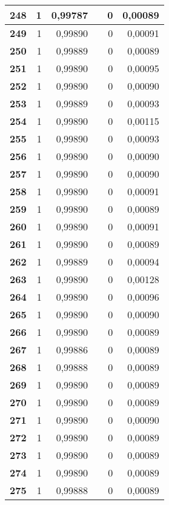 {\begin{longtable}{|r|r|r|l|r|r|}
\textbf{248} & 1 & 0,99787 &  & 0 & 0,00089 \\ \hline
\textbf{249} & 1 & 0,99890 &  & 0 & 0,00091 \\ \hline
\textbf{250} & 1 & 0,99889 &  & 0 & 0,00089 \\ \hline
\textbf{251} & 1 & 0,99890 &  & 0 & 0,00095 \\ \hline
\textbf{252} & 1 & 0,99890 &  & 0 & 0,00090 \\ \hline
\textbf{253} & 1 & 0,99889 &  & 0 & 0,00093 \\ \hline
\textbf{254} & 1 & 0,99890 &  & 0 & 0,00115 \\ \hline
\textbf{255} & 1 & 0,99890 &  & 0 & 0,00093 \\ \hline
\textbf{256} & 1 & 0,99890 &  & 0 & 0,00090 \\ \hline
\textbf{257} & 1 & 0,99890 &  & 0 & 0,00090 \\ \hline
\textbf{258} & 1 & 0,99890 &  & 0 & 0,00091 \\ \hline
\textbf{259} & 1 & 0,99890 &  & 0 & 0,00089 \\ \hline
\textbf{260} & 1 & 0,99890 &  & 0 & 0,00091 \\ \hline
\textbf{261} & 1 & 0,99890 &  & 0 & 0,00089 \\ \hline
\textbf{262} & 1 & 0,99889 &  & 0 & 0,00094 \\ \hline
\textbf{263} & 1 & 0,99890 &  & 0 & 0,00128 \\ \hline
\textbf{264} & 1 & 0,99890 &  & 0 & 0,00096 \\ \hline
\textbf{265} & 1 & 0,99890 &  & 0 & 0,00090 \\ \hline
\textbf{266} & 1 & 0,99890 &  & 0 & 0,00089 \\ \hline
\textbf{267} & 1 & 0,99886 &  & 0 & 0,00089 \\ \hline
\textbf{268} & 1 & 0,99888 &  & 0 & 0,00089 \\ \hline
\textbf{269} & 1 & 0,99890 &  & 0 & 0,00089 \\ \hline
\textbf{270} & 1 & 0,99890 &  & 0 & 0,00089 \\ \hline
\textbf{271} & 1 & 0,99890 &  & 0 & 0,00090 \\ \hline
\textbf{272} & 1 & 0,99890 &  & 0 & 0,00089 \\ \hline
\textbf{273} & 1 & 0,99890 &  & 0 & 0,00089 \\ \hline
\textbf{274} & 1 & 0,99890 &  & 0 & 0,00089 \\ \hline
\textbf{275} & 1 & 0,99888 &  & 0 & 0,00089 \\ \hline

\end{longtable}}
